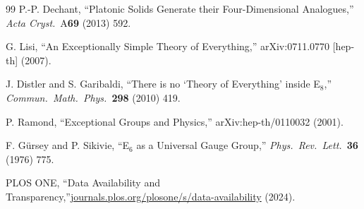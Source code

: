 \documentclass[11pt,a4paper]{article}
\begin{document}
\begin{thebibliography}{99}
P.-P. Dechant, ``Platonic Solids Generate their Four-Dimensional
  Analogues,'' \textit{Acta Cryst.}\ A\textbf{69} (2013) 592.

G. Lisi, ``An Exceptionally Simple Theory of Everything,''
  arXiv:0711.0770 [hep-th] (2007).

J. Distler and S. Garibaldi, ``There is no `Theory of Everything' inside
  E$_8$,'' \textit{Commun.\ Math.\ Phys.}\ \textbf{298} (2010) 419.

P. Ramond, ``Exceptional Groups and Physics,''
  arXiv:hep-th/0110032 (2001).

F. G\"{u}rsey and P. Sikivie, ``E$_6$ as a Universal Gauge Group,''
  \textit{Phys.\ Rev.\ Lett.}\ \textbf{36} (1976) 775.

PLOS ONE, ``Data Availability and Transparency,''\n  \url{journals.plos.org/plosone/s/data-availability} (2024).

\end{thebibliography}
\end{document}
